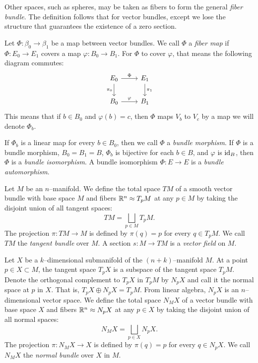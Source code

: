 Other spaces, such as spheres, may be taken as fibers to form the general \emph{fiber bundle}.
The definition follows that for vector bundles, except we lose the structure that guarantees the existence of a zero section.


\begin{defn}
	Let $\Phi:\beta_0\to \beta_1$ be a map between vector bundles.
	We call $\Phi$ a \emph{fiber map} if $\Phi:E_0\to E_1$ covers a map $\varphi:B_0\to B_1$.
	For $\Phi$ to cover $\varphi$, that means the following diagram commutes:
	\[
		\begin{tikzcd}
			E_0 \arrow{r}{\Phi} \arrow[swap]{d}{\pi_0} & E_1 \arrow{d}{\pi_1} \\
			B_0 \arrow{r}{\varphi} & B_1
		\end{tikzcd}
	\]
	This means that if $b\in B_0$ and $\varphi(b)=c$, then $\Phi$ maps $V_b$ to $V_c$ by a map we will denote $\Phi_b$.

	If $\Phi_b$ is a linear map for every $b\in B_0$, then we call $\Phi$ a \emph{bundle morphism}.
	If $\Phi$ is a bundle morphism, $B_0=B_1=B$, $\Phi_b$ is bijective for each $b\in B$, and $\varphi$ is $\textrm{id}_{B}$, then $\Phi$ is a \emph{bundle isomorphism}.
	A bundle isomorphism $\Phi:E\to E$ is a \emph{bundle automorphism}.
\end{defn}

\begin{defn}
	Let $M$ be an $n$--manifold.
	We define the total space $TM$ of a smooth vector bundle with base space $M$ and fibers $\mathbb{R}^n\approx T_p M$ at any $p\in M$ by taking the disjoint union of all tangent spaces:
	\[
		TM = \bigsqcup_{p\in M} T_p M.
	\]
	The projection $\pi:TM\to M$ is defined by $\pi(q)=p$ for every $q\in T_p M$.
	We call $TM$ the \emph{tangent bundle} over $M$.
	A section $s:M\to TM$ is a \emph{vector field} on $M$.
\end{defn}

\begin{defn}
	Let $X$ be a $k$--dimensional submanifold of the $(n+k)$--manifold $M$.
	At a point $p\in X\subset M$, the tangent space $T_p X$ is a subspace of the tangent space $T_p M$.
	Denote the orthogonal complement to $T_p X$ in $T_p M$ by $N_p X$ and call it the normal space at $p$ in $X$.
	That is, $T_p X\oplus N_p X = T_p M$.
	From linear algebra, $N_p X$ is an $n$--dimensional vector space.
	We define the total space $N_M X$ of a vector bundle with base space $X$ and fibers $\mathbb{R}^n\approx N_p X$ at any $p\in X$ by taking the disjoint union of all normal spaces:
	\[
		N_M X = \bigsqcup_{p\in X} N_p X.
	\]
	The projection $\pi:N_M X\to X$ is defined by $\pi(q)=p$ for every $q\in N_p X$.
	We call $N_M X$ the \emph{normal bundle} over $X$ in $M$.	
\end{defn}

